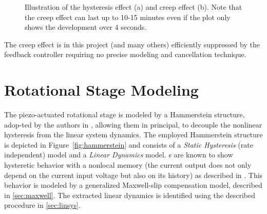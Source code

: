 \begin{figure}[h!]
  \centering %
  \qquad
  \caption{\label{fig:effects} Illustration of the hysteresis effect (a) and creep effect (b). Note that the creep effect can last up to 10-15 minutes even if the plot only shows the development over 4 seconds.}
\end{figure}

The creep effect is in this project (and many others) efficiently suppressed by the feedback controller requiring no precise modeling and cancellation technique.

\section{Rotational Stage Modeling}
The piezo-actuated rotational stage is modeled by a Hammerstein structure, adop-ted by the authors in \citep{ButcherController:2015}, allowing them in principal, to decouple the nonlinear hysteresis from the linear system dynamics. The employed Hammerstein structure is depicted in Figure~\ref{fig:hammerstein} and consists of a \emph{Static Hysteresis} (rate independent) model and a \emph{Linear Dynamics} model. {\abbrPEA}s are known to show hysteretic behavior with a nonlocal memory (the current output does not only depend on the current input voltage but also on its history) as described in \citep{ButcherIdentification:2015}. This behavior is modeled by a generalized Maxwell-slip compensation model, described in \ref{sec:maxwell}. The extracted linear dynamics is identified using the described procedure in \ref{sec:linsys}.

